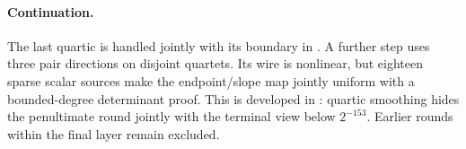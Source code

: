 \paragraph{Continuation.} The last quartic is handled jointly with its boundary in . A further step uses three pair directions on disjoint quartets. Its wire is nonlinear, but eighteen sparse scalar sources make the endpoint/slope map jointly uniform with a bounded-degree determinant proof. This is developed in : quartic smoothing hides the penultimate round jointly with the terminal view below $2^{-153}$. Earlier rounds within the final layer remain excluded.
